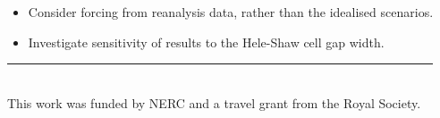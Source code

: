 \documentclass[landscape,24pt, a0paper,colspace=10mm,blockverticalspace=12mm]{tikzposter}
\begin{document}
\begin{columns}
\begin{subcolumns}
{}
 

 
{
\begin{itemize}
\item Consider forcing from reanalysis data, rather than the idealised scenarios.
\item Investigate sensitivity of results to the Hele-Shaw cell gap width.
\end{itemize}
\vspace{5pt}
\rule{\linewidth}{.4pt}
\vspace{5pt} \\
This work was funded by NERC and a travel grant from the Royal Society.
{
\fontsize{16}{15}\selectfont 
\renewcommand\refname{\vskip -2.5cm}

\renewcommand*{\bibfont}{\scriptsize}
\printbibliography
}

}


%

 
\end{subcolumns}

\end{columns}
\end{document}
